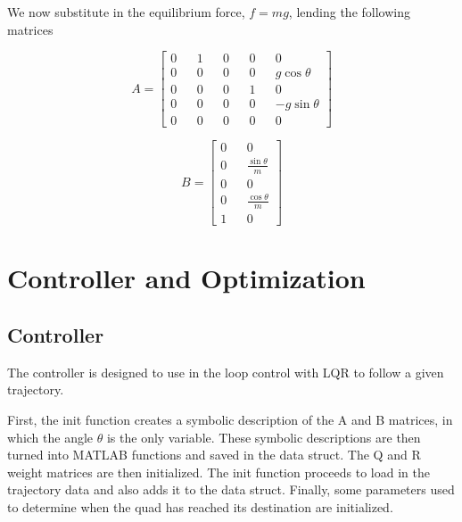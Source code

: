 \documentclass[12pt]{article}
\begin{document}
We now substitute in the equilibrium force, $f = mg$, lending the following matrices

\begin{equation}
\label{A_matrix}
A = \begin{bmatrix} 0 && 1 && 0 && 0 && 0 \\ 0 && 0 && 0 && 0 && g\cos{\theta} \\  0 && 0 && 0 && 1 && 0 \\ 0 && 0 && 0 && 0 && -g\sin{\theta} \\ 0 && 0 && 0 && 0 && 0 \end{bmatrix}
\end{equation}

\begin{equation}
\label{B_matrix}
B = \begin{bmatrix} 0 && 0 \\ 0 && \frac{\sin{\theta}}{m} \\ 0 && 0 \\ 0 && \frac{\cos{\theta}}{m} \\ 1 && 0 \end{bmatrix}
\end{equation}

\section{Controller and Optimization}
\subsection{Controller}
The controller is designed to use in the loop control with LQR to follow a given trajectory.

First, the init function creates a symbolic description of the A and B matrices, in which the angle $\theta$ is the only variable.  These symbolic descriptions are then turned into MATLAB functions and saved in the data struct.  The Q and R weight matrices are then initialized.  The init function proceeds to load in the trajectory data and also adds it to the data struct.  Finally, some parameters used to determine when the quad has reached its destination are initialized.
\end{document}
